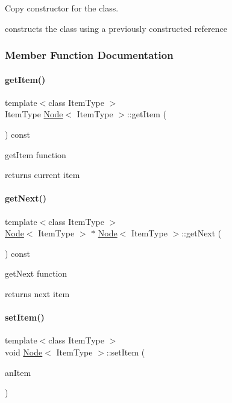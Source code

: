Copy constructor for the class. 

constructs the class using a previously constructed reference 

\subsubsection{Member Function Documentation}
\hypertarget{class_node_a6c08caef312b6f2f69b5e090cf047514}{}\label{class_node_a6c08caef312b6f2f69b5e090cf047514} 
\paragraph{\texorpdfstring{get\+Item()}{getItem()}}
{\footnotesize\ttfamily template$<$class Item\+Type $>$ \\
Item\+Type \hyperlink{class_node}{Node}$<$ Item\+Type $>$\+::get\+Item (\begin{DoxyParamCaption}{ }\end{DoxyParamCaption}) const}



get\+Item function 

returns current item \hypertarget{class_node_a3eb0c96e03a3fd46ea1cff4c305bbedd}{}\label{class_node_a3eb0c96e03a3fd46ea1cff4c305bbedd} 
\paragraph{\texorpdfstring{get\+Next()}{getNext()}}
{\footnotesize\ttfamily template$<$class Item\+Type $>$ \\
\hyperlink{class_node}{Node}$<$ Item\+Type $>$ $\ast$ \hyperlink{class_node}{Node}$<$ Item\+Type $>$\+::get\+Next (\begin{DoxyParamCaption}{ }\end{DoxyParamCaption}) const}



get\+Next function 

returns next item \hypertarget{class_node_ab4ceecdecc5df799011de486b9f54974}{}\label{class_node_ab4ceecdecc5df799011de486b9f54974} 
\paragraph{\texorpdfstring{set\+Item()}{setItem()}}
{\footnotesize\ttfamily template$<$class Item\+Type $>$ \\
void \hyperlink{class_node}{Node}$<$ Item\+Type $>$\+::set\+Item (\begin{DoxyParamCaption}\item[{const Item\+Type \&}]{an\+Item }\end{DoxyParamCaption})}



